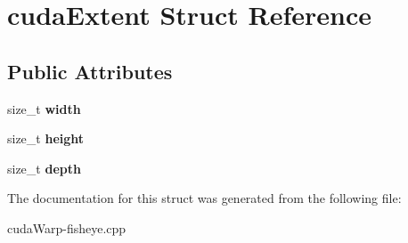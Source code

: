 \hypertarget{structcudaExtent}{}\section{cuda\+Extent Struct Reference}
\label{structcudaExtent}
\subsection*{Public Attributes}
\begin{DoxyCompactItemize}
\item 
size\+\_\+t {\bfseries width}\hypertarget{structcudaExtent_a774b7b99b827dbd9f5456041b20ab319}{}\label{structcudaExtent_a774b7b99b827dbd9f5456041b20ab319}

\item 
size\+\_\+t {\bfseries height}\hypertarget{structcudaExtent_a52b01e552a3d6b36e2b17fae948414f7}{}\label{structcudaExtent_a52b01e552a3d6b36e2b17fae948414f7}

\item 
size\+\_\+t {\bfseries depth}\hypertarget{structcudaExtent_aba8ba71ca34c3875ec3f8f7e064af750}{}\label{structcudaExtent_aba8ba71ca34c3875ec3f8f7e064af750}

\end{DoxyCompactItemize}


The documentation for this struct was generated from the following file\+:\begin{DoxyCompactItemize}
\item 
cuda\+Warp-\/fisheye.\+cpp\end{DoxyCompactItemize}
